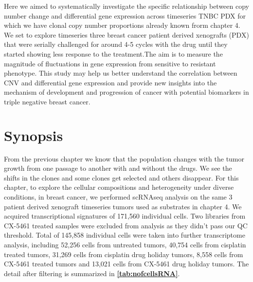 Here we aimed to systematically investigate the specific relationship between copy number change and differential gene expression across timeseries TNBC PDX for which we have clonal copy number proportions already known frorm chapter 4. We set to explore timeseries three breast cancer patient derived xenografts (PDX) that were serially challenged for around 4-5 cycles with the drug until they started showing less response to the treatment.The aim is to measure the magnitude of fluctuations in gene expression from sensitive to resistant phenotype.
This study may help us better understand the correlation between CNV and differential gene expression and provide new insights into the mechanism of development and progression of cancer with potential biomarkers in triple negative breast cancer.

 \section{Synopsis}
 From the previous chapter we know that the population changes with the tumor growth from one passage to another with and without the drugs. We see the shifts in the clones and some clones get selected and others disappear.
For this chapter, to explore the cellular compositions and heterogeneity under diverse conditions, in breast cancer, we performed scRNAseq analysis on the same 3 patient derived xenograft timeseries tumors used as substrates in chapter 4. We acquired transcriptional signatures of 171,560 individual cells. Two libraries from CX-5461 treated samples were excluded from analysis as they didn't pass our QC threshold. Total of 145,858 individual cells were taken into further transcriptome analysis, including  52,256 cells from untreated tumors, 40,754 cells from cisplatin treated tumors, 31,269 cells from cisplatin drug holiday tumors, 8,558 cells from CX-5461 treated tumors and 13,021 cells from CX-5461 drug holiday tumors. The detail after filtering is summarized in  \textbf{\autoref{tab:nofcellsRNA}}.

